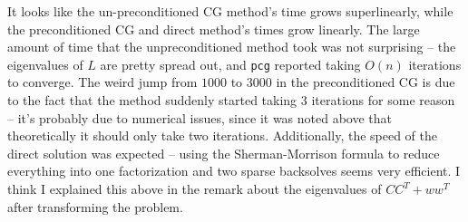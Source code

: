 \documentclass{article}
\begin{document}
It looks like the un-preconditioned CG method's time grows superlinearly, while the preconditioned CG and direct method's times grow linearly. The large amount of time that the unpreconditioned method took was not surprising -- the eigenvalues of $L$ are pretty spread out, and \verb|pcg| reported taking $O(n)$ iterations to converge. 
The weird jump from $1000$ to $3000$ in the preconditioned CG is due to the fact that the method suddenly started taking 3 iterations for some reason -- it's probably due to numerical issues, since it was noted above that theoretically it should only take two iterations. Additionally, the speed of the direct solution was expected -- using the Sherman-Morrison formula to reduce everything into one factorization and two sparse backsolves seems very efficient.
I think I explained this above in the remark about the eigenvalues of $CC^T+ww^T$ after transforming the problem.
\end{document}
